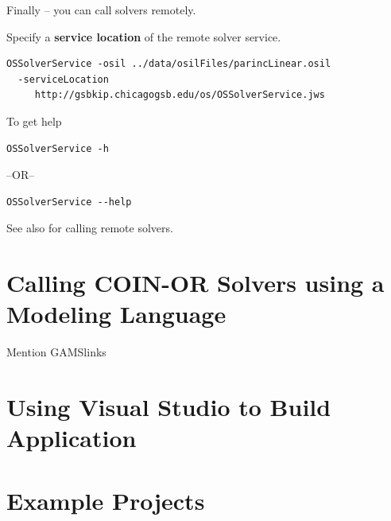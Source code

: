 \documentclass[11pt]{article}
\renewcommand{\_}{{\char"5F}}
\renewcommand{\{}{{\char"7B}}
\renewcommand{\}}{{\char"7D}}
\renewcommand{\^}{{\char"0D}}
\renewcommand{\'}{{\char"0D}}
\begin{document}
Finally -- you can call solvers remotely.

\vfill

Specify a {\bf service  location} of the remote solver service.
\vfill

\begin{verbatim}
OSSolverService -osil ../data/osilFiles/parincLinear.osil
  -serviceLocation 
     http://gsbkip.chicagogsb.edu/os/OSSolverService.jws
\end{verbatim}











To get help

\vfill
\begin{verbatim}
OSSolverService -h     
\end{verbatim}

 --OR--    
 
\begin{verbatim} 
OSSolverService --help
\end{verbatim}






See also for calling remote solvers. 

\section{Calling COIN-OR  Solvers using a Modeling Language}

Mention GAMSlinks

\section{Using Visual Studio to Build Application}

\section{Example Projects}
\end{document}
